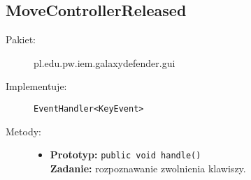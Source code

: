 \documentclass[a4paper]{article}
\newcommand{\prog}{\texttt}
\begin{document}
\subsection{MoveControllerReleased}
\begin{description}
    \item[Pakiet:] pl.edu.pw.iem.galaxydefender.gui
    \item[Implementuje:] \prog{EventHandler<KeyEvent>}
    \item[Metody:] \hfill
    \begin{itemize}
        \item \textbf{Prototyp:} \prog{public void handle()}\\\textbf{Zadanie:} rozpoznawanie zwolnienia klawiszy.
    \end{itemize}
\end{description}
\end{document}
